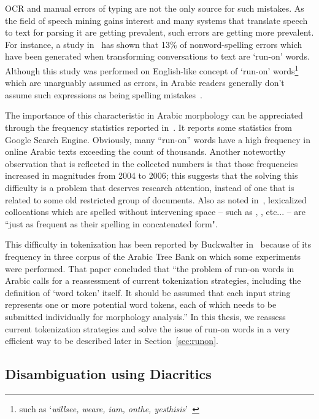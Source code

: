 \documentclass[a4,12pt]{report}
\newcommand{\noVocRL}[1]{\transtrue\novocalize\RL{#1}\vocalize}
\begin{document}
OCR and manual errors of typing are not the only source for such mistakes. As the field
of speech mining gains interest and many systems that translate speech to text for parsing it
are getting prevalent, such errors are getting more prevalent. For instance, a study in~\cite{Kukich:92}
has shown that 13\% of nonword-spelling errors which have been generated when transforming
conversations to text are `run-on' words. Although this study was performed on English-like concept of
`run-on' words\footnote{such as `{\em willsee, weare, iam, onthe, yesthisis}'~\cite{Kukich:92}} 
which are unarguably assumed as errors, in Arabic readers generally don't assume such
expressions as being spelling mistakes~\cite{Buckwalter:04}.

The importance of this characteristic in Arabic morphology can be appreciated 
through the frequency statistics reported in~\cite{Sou07}. It reports some statistics
from Google Search Engine. Obviously, many ``run-on'' words have a high frequency in online 
Arabic texts exceeding the count of thousands. Another noteworthy observation that is reflected
in the collected numbers is that those frequencies increased in magnitudes from 2004 to 2006; this 
suggests that the solving this difficulty is a problem that deserves research attention, instead of 
one that is related to some old restricted group of documents. Also as noted in~\cite{Buckwalter:04},
lexicalized collocations which are spelled without intervening space -- such as \noVocRL{lAyzAl}, 
\noVocRL{lAbod}, etc... -- are ``just as frequent as their spelling in concatenated form".

This difficulty in tokenization has been reported by Buckwalter in~\cite{Buckwalter:04} because of its 
frequency in three corpus of the Arabic Tree Bank on which some experiments were performed. 
That paper concluded that ``the problem of run-on words in Arabic calls for
a reassessment of current tokenization strategies,
including the definition of `word token' itself. It
should be assumed that each input string represents
one or more potential word tokens, each of which
needs to be submitted individually for morphology
analysis.'' In this thesis, we reassess current tokenization strategies and solve the issue
of run-on words in a very efficient way to be described later in Section~\ref{sec:runon}.

\subsection{Disambiguation using Diacritics}
\end{document}
